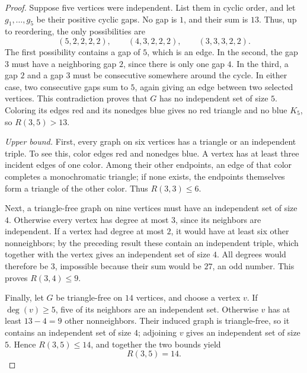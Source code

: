 \documentclass[12pt]{amsart}
\begin{document}
\begin{onehalfspace}
\begin{proof}
            Suppose five vertices were independent.  List them in cyclic
            order, and let $g_1,\ldots,g_5$ be their positive cyclic gaps.
            No gap is $1$, and their sum is $13$.  Thus, up to reordering,
            the only possibilities are
            \[
                (5,2,2,2,2),\qquad(4,3,2,2,2),\qquad(3,3,3,2,2).
            \]
            The first possibility contains a gap of $5$, which is an edge.
            In the second, the gap $3$ must have a neighboring gap $2$,
            since there is only one gap $4$.  In the third, a gap $2$ and a
            gap $3$ must be consecutive somewhere around the cycle.
            In either case, two consecutive gaps sum to $5$, again giving
            an edge between two selected vertices.  This contradiction
            proves that $G$ has no independent set of size $5$.  Coloring
            its edges red and its nonedges blue gives no red triangle and
            no blue $K_5$, so $R(3,5)>13$.

            \noindent\emph{Upper bound.}
            First, every graph on six vertices has a triangle or an
            independent triple.  To see this, color edges red and nonedges
            blue.  A vertex has at least three incident edges of one color.
            Among their other endpoints, an edge of that color completes a
            monochromatic triangle; if none exists, the endpoints themselves
            form a triangle of the other color.  Thus $R(3,3)\le6$.

            Next, a triangle-free graph on nine vertices must have an
            independent set of size $4$.  Otherwise every vertex has degree
            at most $3$, since its neighbors are independent.  If a vertex
            had degree at most $2$, it would have at least six other
            nonneighbors; by the preceding result these contain an
            independent triple, which together with the vertex gives an
            independent set of size $4$.  All degrees would therefore be
            $3$, impossible because their sum would be $27$, an odd number.
            This proves $R(3,4)\le9$.

            Finally, let $G$ be triangle-free on $14$ vertices, and choose a
            vertex $v$.  If $\deg(v)\ge5$, five of its neighbors are an
            independent set.  Otherwise $v$ has at least $13-4=9$ other
            nonneighbors.  Their induced graph is triangle-free, so it
            contains an independent set of size $4$; adjoining $v$ gives
            an independent set of size $5$.  Hence $R(3,5)\le14$, and
            together the two bounds yield
            \[
                R(3,5)=14.
            \]
        \end{proof}

    \end{onehalfspace}
\end{document}
